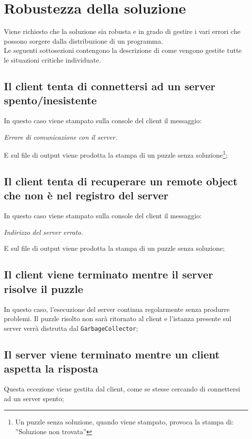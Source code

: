 \documentclass[a4paper, 12pt]{article}
\begin{document}
\section{Robustezza della soluzione}
Viene richiesto che la soluzione sia robusta e in grado di gestire i vari errori che possono sorgere dalla distribuzione di un programma. \\
Le seguenti sottosezioni contengono la descrizione di come vengono gestite tutte le situazioni critiche individuate.

\subsection{Il client tenta di connettersi ad un server spento/inesistente}
In questo caso viene stampato sulla console del client il messaggio:
\begin{center}
\textit{Errore di comunicazione con il server.}
\end{center}
E sul file di output viene prodotta la stampa di un puzzle senza soluzione\footnote{Un puzzle senza soluzione, quando viene stampato, provoca la stampa di: ''Soluzione non trovata''};




\subsection{Il client tenta di recuperare un remote object che non è nel registro del server}
In questo caso viene stampato sulla console del client il messaggio:
\begin{center}
\textit{Indirizzo del server errato.}
\end{center}
E sul file di output viene prodotta la stampa di un puzzle senza soluzione;

\subsection{Il client viene terminato mentre il server risolve il puzzle}
In questo caso, l'esecuzione del server continua regolarmente senza produrre problemi. Il puzzle risolto non sarà ritornato al client e l'istanza presente sul server verrà distrutta dal \texttt{GarbageCollector};

\subsection{Il server viene terminato mentre un client aspetta la risposta}
Questa eccezione viene gestita dal client, come se stesse cercando di connettersi ad un server spento;
\end{document}
